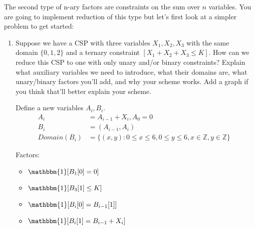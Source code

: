 \documentclass[10pt]{article}
\begin{document}
The second type of n-ary factors are constraints on the sum over $n$ variables. You are going to implement reduction of this type but let's first look at a simpler problem to get started:

\begin{enumerate}[label=(\alph*)]

  \item Suppose we have a CSP with three variables $X_1, X_2, X_3$ with the same domain $\{ 0, 1, 2 \}$ and a ternary constraint $[X_1 + X_2 + X_3 \leq K]$. How can we reduce this CSP to one with only unary and/or binary constraints? Explain what auxiliary variables we need to introduce, what their domains are, what unary/binary factors you'll add, and why your scheme works. Add a graph if you think that'll better explain your scheme.
  
  Define a new variables $A_i, B_i$.
	\begin{align*}
		A_i &= A_{i-1} + X_i, A_0 = 0\\
		B_i &= (A_{i-1}, A_i)\\
  		Domain(B_i) &= \{ (x,y) : 0 \leq x \leq 6, 0 \leq y \leq 6, x \in \mathbb{Z}, y \in \mathbb{Z} \}
	\end{align*}	  
  
  
  Factors:
  \begin{itemize}
  		\item $\mathbbm{1}[B_1[0] = 0]$
  		\item $\mathbbm{1}[B_3[1] \leq K]$
  		\item $\mathbbm{1}[B_i[0] = B_{i-1}[1]]$
  		\item $\mathbbm{1}[B_i[1] = B_{i-1} + X_i]$
  \end{itemize}
  
  \begin{center}
\end{center}
\end{enumerate}
\end{document}
